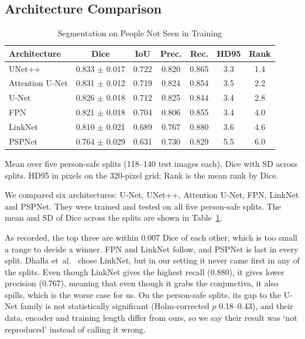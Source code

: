 \documentclass[conference]{IEEEtran}
\begin{document}
\subsection{Architecture Comparison}
\begin{table}[t]
\caption{Segmentation on People Not Seen in Training}
\label{tab:arch}
\centering
\footnotesize
\setlength{\tabcolsep}{3.5pt}
\begin{tabular}{@{}lcccccc@{}}
\toprule
Architecture & Dice & IoU & Prec. & Rec. & HD95 & Rank \\
\midrule
UNet++ & 0.833 $\pm$ 0.017 & 0.722 & 0.820 & 0.865 & 3.3 & 1.4 \\
Attention U-Net & 0.831 $\pm$ 0.012 & 0.719 & 0.824 & 0.854 & 3.5 & 2.2 \\
U-Net & 0.826 $\pm$ 0.018 & 0.712 & 0.825 & 0.844 & 3.4 & 2.8 \\
FPN & 0.821 $\pm$ 0.018 & 0.704 & 0.806 & 0.855 & 3.4 & 4.0 \\
LinkNet & 0.810 $\pm$ 0.021 & 0.689 & 0.767 & 0.880 & 3.6 & 4.6 \\
PSPNet & 0.764 $\pm$ 0.029 & 0.631 & 0.730 & 0.829 & 5.5 & 6.0 \\
\bottomrule
\end{tabular}

\vspace{2pt}
\parbox{\columnwidth}{\scriptsize Mean over five person-safe splits (118--140
test images each), Dice with SD across splits. HD95 in pixels on the 320-pixel
grid; Rank is the mean rank by Dice.}
\end{table}
We compared six architectures: U-Net, UNet++, Attention U-Net, FPN, LinkNet and
PSPNet. They were trained and tested on all five person-safe splits. The mean
and SD of Dice across the splits are shown in Table~\ref{tab:arch}.

As recorded, the top three are within 0.007 Dice of each other, which is too
small a range to decide a winner. FPN and LinkNet follow, and PSPNet is last in
every split. Dhalla et~al.~\cite{dhalla2023} chose LinkNet, but in our setting
it never came first in any of the splits. Even though LinkNet gives the highest
recall (0.880), it gives lower precision (0.767), meaning that even though it
grabs the conjunctiva, it also spills, which is the worse case for us. On the
person-safe splits, its gap to the U-Net family is not statistically
significant (Holm-corrected $p$ 0.18--0.43), and their data, encoder and
training length differ from ours, so we say their result was `not reproduced'
instead of calling it wrong.
\end{document}
